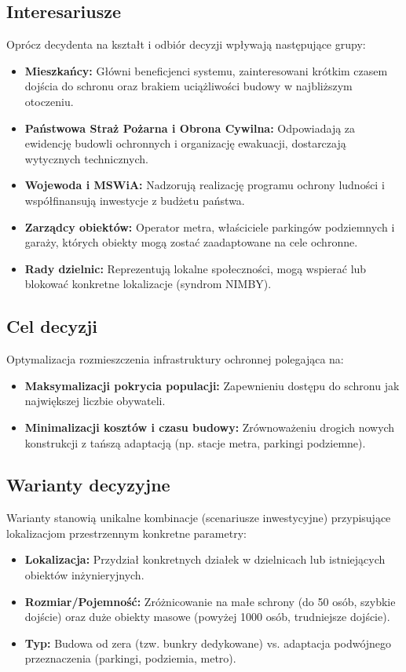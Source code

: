 \documentclass[12pt,a4paper]{article}
\begin{document}
\subsection{Interesariusze}
Oprócz decydenta na kształt i odbiór decyzji wpływają następujące grupy:
\begin{itemize}
    \item \textbf{Mieszkańcy:} Główni beneficjenci systemu, zainteresowani krótkim czasem dojścia do schronu oraz brakiem uciążliwości budowy w najbliższym otoczeniu.
    \item \textbf{Państwowa Straż Pożarna i Obrona Cywilna:} Odpowiadają za ewidencję budowli ochronnych i organizację ewakuacji, dostarczają wytycznych technicznych.
    \item \textbf{Wojewoda i MSWiA:} Nadzorują realizację programu ochrony ludności i współfinansują inwestycje z budżetu państwa.
    \item \textbf{Zarządcy obiektów:} Operator metra, właściciele parkingów podziemnych i garaży, których obiekty mogą zostać zaadaptowane na cele ochronne.
    \item \textbf{Rady dzielnic:} Reprezentują lokalne społeczności, mogą wspierać lub blokować konkretne lokalizacje (syndrom NIMBY).
\end{itemize}

\subsection{Cel decyzji}
Optymalizacja rozmieszczenia infrastruktury ochronnej polegająca na:
\begin{itemize}
    \item \textbf{Maksymalizacji pokrycia populacji:} Zapewnieniu dostępu do schronu jak największej liczbie obywateli.
    \item \textbf{Minimalizacji kosztów i czasu budowy:} Zrównoważeniu drogich nowych konstrukcji z tańszą adaptacją (np. stacje metra, parkingi podziemne).
\end{itemize}

\subsection{Warianty decyzyjne}
Warianty stanowią unikalne kombinacje (scenariusze inwestycyjne) przypisujące lokalizacjom przestrzennym konkretne parametry:
\begin{itemize}
    \item \textbf{Lokalizacja:} Przydział konkretnych działek w dzielnicach lub istniejących obiektów inżynieryjnych.
    \item \textbf{Rozmiar/Pojemność:} Zróżnicowanie na małe schrony (do 50 osób, szybkie dojście) oraz duże obiekty masowe (powyżej 1000 osób, trudniejsze dojście).
    \item \textbf{Typ:} Budowa od zera (tzw. bunkry dedykowane) vs. adaptacja podwójnego przeznaczenia (parkingi, podziemia, metro).
\end{itemize}
\end{document}
